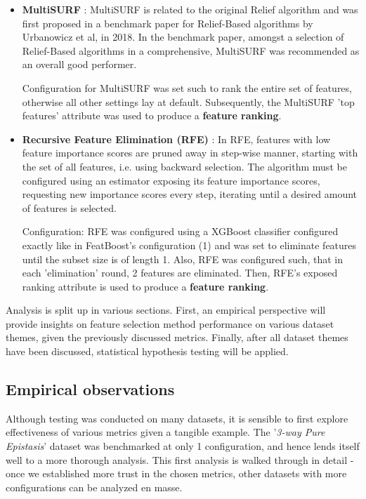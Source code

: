 \documentclass{article}
\begin{document}
\begin{itemize}
    \item \textbf{MultiSURF} \citep{urbanowicz2018benchmarking} \citep{urbanowicz2018relief}: MultiSURF is related to the original Relief algorithm \citep{kira1992feature} and was first proposed in a benchmark paper for Relief-Based algorithms by Urbanowicz et al, in 2018. In the benchmark paper, amongst a selection of Relief-Based algorithms in a comprehensive, MultiSURF was recommended as an overall good performer.
    
    Configuration for MultiSURF was set such to rank the entire set of features, otherwise all other settings lay at default. Subsequently, the MultiSURF 'top features' attribute was used to produce a \textbf{feature ranking}.
    
    \item \textbf{Recursive Feature Elimination (RFE)} \citep{guyon2002gene}: In RFE, features with low feature importance scores are pruned away in step-wise manner, starting with the set of all features, i.e. using backward selection. The algorithm must be configured using an estimator exposing its feature importance scores, requesting new importance scores every step, iterating until a desired amount of features is selected.
    
    Configuration: RFE was configured using a XGBoost classifier configured exactly like in FeatBoost's configuration (1) and was set to eliminate features until the subset size is of length 1. Also, RFE was configured such, that in each 'elimination' round, 2 features are eliminated. Then, RFE's exposed ranking attribute is used to produce a \textbf{feature ranking}.
\end{itemize}

Analysis is split up in various sections. First, an empirical perspective will provide insights on feature selection method performance on various dataset themes, given the previously discussed metrics. Finally, after all dataset themes have been discussed, statistical hypothesis testing will be applied.

\subsection{Empirical observations}
Although testing was conducted on many datasets, it is sensible to first explore effectiveness of various metrics given a tangible example. The '\textit{3-way Pure Epistasis}' dataset was benchmarked at only 1 configuration, and hence lends itself well to a more thorough analysis. This first analysis is walked through in detail - once we established more trust in the chosen metrics, other datasets with more configurations can be analyzed en masse.
\end{document}
